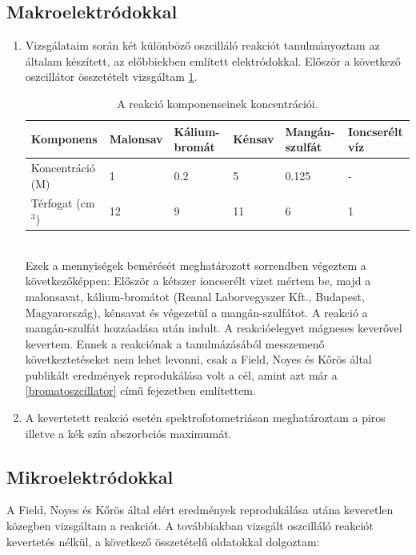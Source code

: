 \subsection{Makroelektródokkal}
\begin{enumerate}
\item Vizsgálataim során két különböző oszcilláló reakciót tanulmányoztam az általam készített, az előbbiekben említett elektródokkal. 
Először a következő oszcillátor összetételt vizsgáltam \ref{my-label}.
\begin{table}[h!]
\centering
\caption{A reakció komponenseinek koncentrációi.}
\label{my-label}
\begin{tabular}{llllll}
Komponens                       & Malonsav & Kálium-bromát & Kénsav & Mangán-szulfát & Ioncserélt víz \\
\hline
Koncentráció (M)                & 1        & 0.2           & 5      & 0.125          & -              \\
Térfogat (cm$^3$) & 12       & 9             & 11     & 6              & 1              \\
\end{tabular}
\end{table}\\
Ezek a mennyiségek bemérését meghatározott sorrendben végeztem a következőképpen: Először a kétszer ioncserélt vizet mértem be, majd a malonsavat, kálium-bromátot (Reanal Laborvegyszer Kft., Budapest, Magyarország), kénsavat és végezetül a mangán-szulfátot. A reakció a mangán-szulfát hozzáadása után indult. A reakcióelegyet mágneses keverővel kevertem. Ennek a reakciónak a tanulmázásából messzemenő következtetéseket nem lehet levonni, csak a Field, Noyes és Kőrös által publikált eredmények reprodukálása \cite{noyes1972oscillations} volt a cél, amint azt már a \ref{bromatoszcillator} című fejezetben említettem.
\item A kevertetett reakció esetén spektrofotometriásan meghatároztam a piros illetve a kék szín abszorbciós maximumát.
\end{enumerate}

\subsection{Mikroelektródokkal} \label{mikroelektrod}

A Field, Noyes és Kőrös által elért eredmények reprodukálása utána \cite{noyes1972oscillations} keveretlen közegben vizsgáltam a reakciót.
A továbbiakban vizsgált oszcilláló reakciót kevertetés nélkül, a következő összetételű oldatokkal dolgoztam: 

